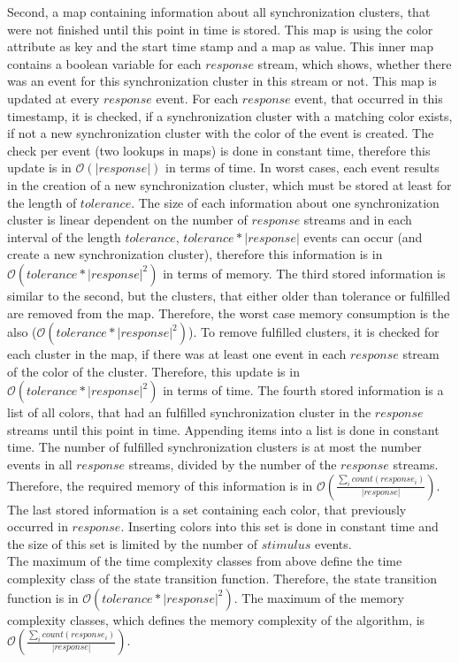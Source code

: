 	Second, a map containing information about all synchronization clusters, that were not finished until this point in time is stored. This map is using the color attribute as key and the start time stamp and a map as value. This inner map contains a boolean variable for each $response$ stream, which shows, whether there was an event for this synchronization cluster in this stream or not. This map is updated at every $response$ event. For each $response$ event, that occurred in this timestamp, it is checked, if a synchronization cluster with a matching color exists, if not a new synchronization cluster with the color of the event is created. The check per event (two lookups in maps)  is done in constant time, therefore this update is in $\mathcal{O}(|response|)$ in terms of time. In worst cases, each event results in the creation of a new synchronization cluster, which must be stored at least for the length of $tolerance$. The size of each information about one synchronization cluster is linear dependent on the number of $response$ streams and in each interval of the length $tolerance$, $tolerance*|response|$ events can occur (and create a new synchronization cluster), therefore this information is in $\mathcal{O}(tolerance*|response|^2)$ in terms of memory. The third stored information is similar to the second, but the clusters, that either older than tolerance or fulfilled are removed from the map. Therefore, the worst case memory consumption is the also ($\mathcal{O}(tolerance*|response|^2)$). To remove fulfilled clusters, it is checked for each cluster in the map, if there was at least one event in each $response$ stream of the color of the cluster. Therefore, this update is in $\mathcal{O}(tolerance*|response|^2)$ in terms of time.
	The fourth stored information is a list of all colors, that had an fulfilled synchronization cluster in the $response$ streams until this point in time. Appending items into a list is done in constant time. The number of fulfilled synchronization clusters is at most the number events in all $response$ streams, divided by the number of the $response$ streams. Therefore, the required memory of this information is in $\mathcal{O}\left(\frac{\sum_i count(response_i)}{|response|}\right)$. The last stored information is a set containing each color, that previously occurred in $response$. Inserting colors into this set is done in constant time and the size of this set is limited by the number of $stimulus$ events.\\
	The maximum of the time complexity classes from above define the time complexity class of the state transition function. Therefore, the state transition function is in $\mathcal{O}(tolerance*|response|^2)$. The maximum of the memory complexity classes, which defines the memory complexity of the algorithm, is $\mathcal{O}\left(\frac{\sum_i count(response_i)}{|response|}\right)$.\\
